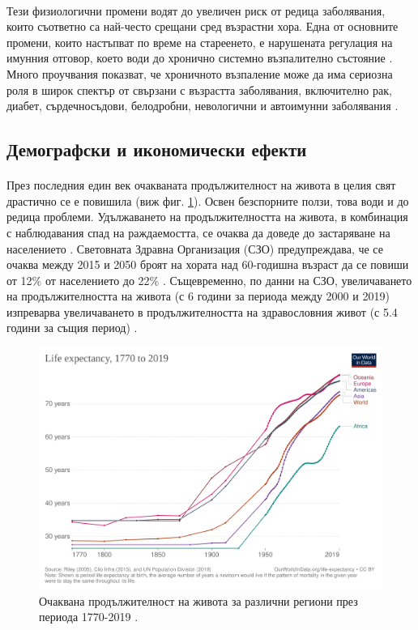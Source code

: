 \documentclass[pdftex,cyrillic,14pt,a4page,twoside,openright]{extreport}
\begin{document}
\paragraph{}
Тези физиологични промени водят до увеличен риск от редица заболявания, които съответно са най-често срещани сред възрастни хора. Една от основните промени, които настъпват по време на стареенето, е нарушената регулация на имунния отговор, което води до хронично системно възпалително състояние \cite{curwen2004}. Много проучвания показват, че хроничното възпаление може да има сериозна роля в широк спектър от свързани с възрастта заболявания, включително рак, диабет, сърдечносъдови, белодробни, невологични и автоимунни заболявания \cite{khansari2009, kuzhuvelil2008}.

\subsection{Демографски и икономически ефекти}
\paragraph{}
През последния един век очакваната продължителност на живота в целия свят драстично се е повишила \cite{zijdeman2016} (виж фиг. \ref{fig:life_expectancy}). Освен безспорните ползи, това води и до редица проблеми. Удължаването на продължителността на живота, в комбинация с наблюдавания спад на раждаемостта, се очаква да доведе до застаряване на населението \cite{lutz2008}. Световната Здравна Организация (СЗО) предупреждава, че се очаква между 2015 и 2050 броят на хората над 60-годишна възраст да се повиши от 12\% от населението до 22\% \cite{who_report_ageing2015}. Същевременно, по данни на СЗО, увеличаването на продължителността на живота (с 6 години за периода между 2000 и 2019) изпреварва увеличаването в продължителността на здравословния живот (с 5.4 години за същия период) \cite{who_health2020}.

\begin{figure}[h]
  \centering
  \includegraphics[width=12cm]{figures/life-expectancy}
  \caption {Очаквана продължителност на живота за различни региони през периода 1770-2019 \cite{zijdeman2016}.}
  \label{fig:life_expectancy}
\end{figure}
\end{document}
